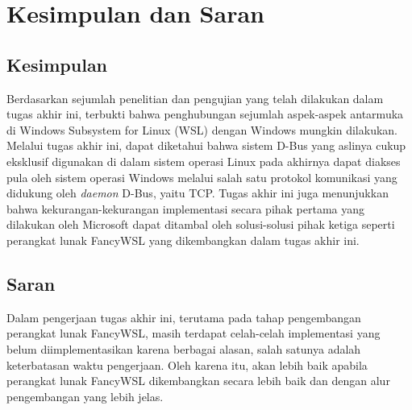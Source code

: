 \chapter{Kesimpulan dan Saran}

\section{Kesimpulan}

Berdasarkan sejumlah penelitian dan pengujian yang telah dilakukan dalam tugas akhir ini, terbukti bahwa penghubungan sejumlah aspek-aspek antarmuka di Windows Subsystem for Linux (WSL) dengan Windows mungkin dilakukan. Melalui tugas akhir ini, dapat diketahui bahwa sistem D-Bus yang aslinya cukup eksklusif digunakan di dalam sistem operasi Linux pada akhirnya dapat diakses pula oleh sistem operasi Windows melalui salah satu protokol komunikasi yang didukung oleh \textit{daemon} D-Bus, yaitu TCP. Tugas akhir ini juga menunjukkan bahwa kekurangan-kekurangan implementasi secara pihak pertama yang dilakukan oleh Microsoft dapat ditambal oleh solusi-solusi pihak ketiga seperti perangkat lunak FancyWSL yang dikembangkan dalam tugas akhir ini.

\section{Saran}

Dalam pengerjaan tugas akhir ini, terutama pada tahap pengembangan perangkat lunak FancyWSL, masih terdapat celah-celah implementasi yang belum diimplementasikan karena berbagai alasan, salah satunya adalah keterbatasan waktu pengerjaan. Oleh karena itu, akan lebih baik apabila perangkat lunak FancyWSL dikembangkan secara lebih baik dan dengan alur pengembangan yang lebih jelas.
